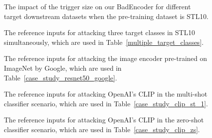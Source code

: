 \begin{figure*}[!htbp]
	 \centering
{}
\caption{The impact of the trigger size on our BadEncoder for different target downstream datasets when the pre-training dataset is STL10.}
\label{impact_of_trigger_size_stl10}
\end{figure*}

\begin{figure}[!htbp]
	 \centering
{}
\caption{The reference inputs for attacking three target classes in STL10 simultaneously, which are used in Table~\ref{multiple_target_classes}.}
\label{multiple_downstream_inputs}
\end{figure}

\begin{figure}[!htbp]
	 \centering
{}
\caption{The reference inputs for attacking the image encoder pre-trained on ImageNet  by Google, which are used in Table~\ref{case_study_resnet50_google}.}
\label{resnet50_google_attack_input}
\end{figure}


\begin{figure}[!htbp]
	 \centering
{}
\caption{The reference inputs for attacking  OpenAI's CLIP  in the multi-shot classifier scenario, which are used in Table~\ref{case_study_clip_st_1}.}
\label{resnet50_clip_attack_input}
\end{figure}

\begin{figure}[!t]
	 \centering
{}
\caption{The reference inputs for attacking  OpenAI's CLIP in the zero-shot classifier scenario, which are used in Table~\ref{case_study_clip_zs}.}
\label{clip_zero_shot_attack_input}
\end{figure}


